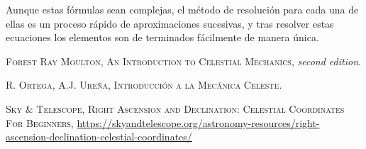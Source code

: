 \documentclass[11pt]{article}
\begin{document}
Aunque estas fórmulas sean complejas, el método de resolución para cada una de ellas es un proceso rápido de aproximaciones sucesivas, y tras resolver estas ecuaciones los elementos son de terminados fácilmente de manera única.\\
\fi










\newpage

\begin{thebibliography}{99}
 \textsc{Forest Ray Moulton}, \textsc{An Introduction to Celestial Mechanics}, \textit{second edition}.

 \textsc{R. Ortega, A.J. Ureña}, \textsc{Introducción a la Mecánica Celeste}.

 \textsc{Sky \& Telescope}, \textsc{Right Ascension and Declination: Celestial Coordinates For Beginners}, \url{https://skyandtelescope.org/astronomy-resources/right-ascension-declination-celestial-coordinates/}

\end{thebibliography}
\end{document}
